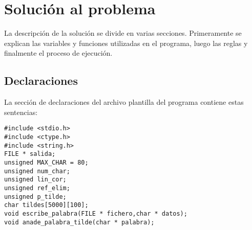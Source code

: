 \documentclass[12pt,titlepage,a4paper]{article}
\theoremstyle{definicion}
\theoremstyle{lema}
\theoremstyle{teorema}
\theoremstyle{corolario}
\theoremstyle{ejemplo}
\theoremstyle{nota}
\begin{document}
\section{Solución al problema}

La descripción de la solución se divide en varias secciones. Primeramente se
explican las variables y funciones utilizadas en el programa, luego las reglas
y finalmente el proceso de ejecución.

\subsection{Declaraciones}

La sección de declaraciones del archivo plantilla del programa contiene estas
sentencias:
\smallskip
\begin{lstlisting}
#include <stdio.h>
#include <ctype.h>
#include <string.h>
FILE * salida;
unsigned MAX_CHAR = 80;
unsigned num_char;
unsigned lin_cor;
unsigned ref_elim;
unsigned p_tilde;
char tildes[5000][100];
void escribe_palabra(FILE * fichero,char * datos);
void anade_palabra_tilde(char * palabra);
\end{lstlisting}
\end{document}
